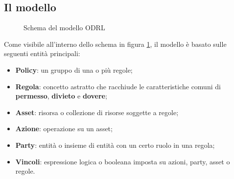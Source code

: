 \documentclass[12pt,a4paper,twoside]{book}
\begin{document}
\subsection{Il modello}\label{modello}
\begin{figure}[H]
	\centering
	\def\svgwidth{\columnwidth}
	
	\caption{Schema del modello ODRL\cite{ODRLinfMod}\label{ODRLModelSchema}}
\end{figure}
Come visibile all'interno dello schema in figura \ref{ODRLModelSchema}, il modello è basato sulle seguenti entità principali:
\begin{itemize}
	\item \textbf{Policy}: un gruppo di una o più regole;
	\item \textbf{Regola}: concetto astratto che racchiude le caratteristiche comuni di \textbf{permesso}, \textbf{divieto} e \textbf{dovere};
	\item \textbf{Asset}: risorsa o collezione di risorse soggette a regole;
	\item \textbf{Azione}: operazione su un asset;
	\item \textbf{Party}: entità o insieme di entità con un certo ruolo in una regola;
	\item \textbf{Vincoli}: espressione logica o booleana imposta su azioni, party, asset o regole.
\end{itemize}
\end{document}
